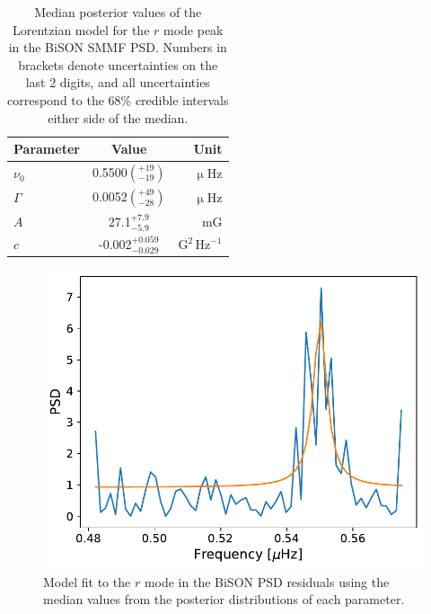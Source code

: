 \vspace{1em}

\begin{table}[!ht]
	\begin{center}
		\caption{Median posterior values of the Lorentzian model for the $r$ mode peak in the BiSON SMMF PSD. Numbers in brackets denote uncertainties on the last 2 digits, and all uncertainties correspond to the 68\% credible intervals either side of the median.}
		\label{tab:rmode_fit_params}
		\begin{tabular}{l c r}
			\hline
			{Parameter} & {Value} & {Unit} \\
			\hline
			
			{$\nu_0$} & {0.5500$\left(_{-19}^{+19}\right)$} & {$\upmu\mathrm{Hz} $}\\
			
			{$\Gamma$} & {0.0052$\left(_{-28}^{+49}\right)$} & {$\upmu\mathrm{Hz} $} \\
			
			{$A$} & {27.1$_{-5.9}^{+7.9}$} & {mG} \\
			
			
			{$c$} & {-0.002$_{-0.029}^{+0.059}$} & {$\mathrm{G}^2 \, \mathrm{Hz}^{-1}$} \\	
			
			\hline
		\end{tabular}
	\end{center}
\end{table}

\begin{figure}[!ht]
	\centering
	\includegraphics[width=0.65\columnwidth]{symm_r-mode_model_fit.pdf}
	\caption{Model fit to the $r$ mode in the BiSON PSD residuals using the median values from the posterior distributions of each parameter.}  \label{fig:rmode_symm_fit}
\end{figure}

